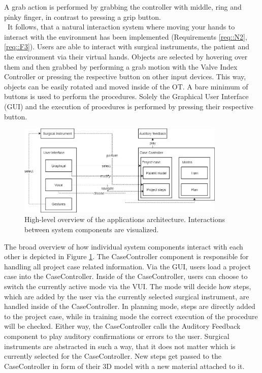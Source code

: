 A grab action is performed by grabbing the controller with middle, ring and pinky finger, in contrast to pressing a grip button.
\\ It follows, that a natural interaction system where moving your hands to interact with the environment has been implemented (Requirements \ref{req::N2}, \ref{req::F3}).
Users are able to interact with surgical instruments, the patient and the environment via their virtual hands.
Objects are selected by hovering over them and then grabbed by performing a grab motion with the Valve Index Controller or pressing the respective button on other input devices.
This way, objects can be easily rotated and moved inside of the OT.
A bare minimum of buttons is used to perform the procedures.
Solely the Graphical User Interface (GUI) and the execution of procedures is performed by pressing their respective button.

\begin{figure}[ht]
    \centering
    \includegraphics[width=375px]{images/implementation/architecture.png}
    \caption{\label{fig::ImplementationArchitecture}High-level overview of the applications architecture. Interactions between system components are visualized.}
\end{figure}

The broad overview of how individual system components interact with each other is depicted in Figure \ref{fig::ImplementationArchitecture}.
The CaseController component is responsible for handling all project case related information.
Via the GUI, users load a project case into the CaseController.
Inside of the CaseController, users can choose to switch the currently active mode via the VUI.
The mode will decide how steps, which are added by the user via the currently selected surgical instrument, are handled inside of the CaseController.
In planning mode, steps are directly added to the project case, while in training mode the correct execution of the procedure will be checked.
Either way, the CaseController calls the Auditory Feedback component to play auditory confirmations or errors to the user.
Surgical instruments are abstracted in such a way, that it does not matter which is currently selected for the CaseController.
New steps get passed to the CaseController in form of their 3D model with a new material attached to it.
